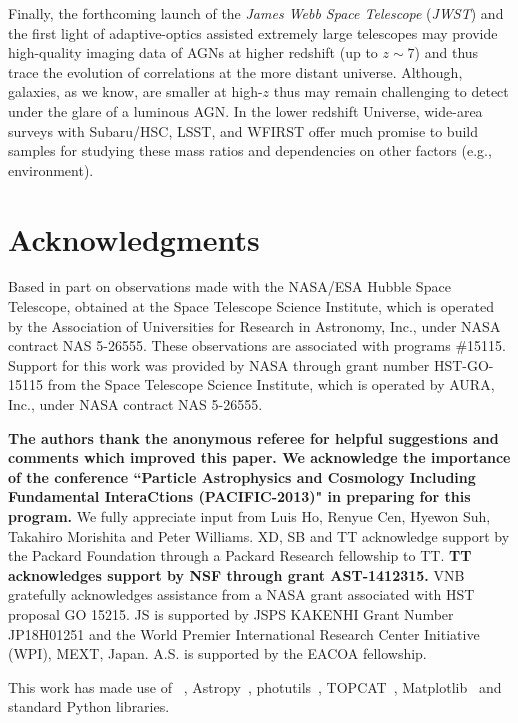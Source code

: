 \documentclass[apj]{emulateapj}
\begin{document}
Finally, the forthcoming launch of the {\it James Webb Space Telescope} ({\it JWST}) and the first light of adaptive-optics assisted extremely large telescopes may provide high-quality imaging data of AGNs at higher redshift (up to $z\sim7$) and thus trace the evolution of correlations at the more distant universe. Although, galaxies, as we know, are smaller at high-$z$ thus may remain challenging to detect under the glare of a luminous AGN. In the lower redshift Universe, wide-area surveys with Subaru/HSC, LSST, and WFIRST offer much promise to build samples for studying these mass ratios and dependencies on other factors (e.g., environment).  

\section*{Acknowledgments}

Based in part on observations made with the NASA/ESA Hubble Space Telescope, obtained at the Space Telescope Science Institute, which is operated by the Association of Universities for Research in Astronomy, Inc., under NASA contract NAS 5-26555. These observations are associated with programs \#15115. Support for this work was provided by NASA through grant number HST-GO-15115 from the Space Telescope Science Institute, which is operated by AURA, Inc., under NASA contract NAS 5-26555.

{\bf The authors thank the anonymous referee for helpful suggestions and comments which improved this paper. We acknowledge the importance of the conference ``Particle Astrophysics and Cosmology Including Fundamental InteraCtions (PACIFIC-2013)" in preparing for this program.} We fully appreciate input from Luis Ho, Renyue Cen, Hyewon Suh, Takahiro Morishita and Peter Williams. XD, SB and TT acknowledge support by the Packard Foundation through a Packard Research fellowship to TT. {\bf TT acknowledges support by NSF through grant AST-1412315.} VNB gratefully acknowledges assistance from a NASA grant associated with HST proposal GO 15215. JS is supported by JSPS KAKENHI Grant Number JP18H01251 and the World Premier International Research Center Initiative (WPI), MEXT, Japan. A.S. is supported by the EACOA fellowship.


This work has made use of \lenstronomy~\citep{lenstronomy}, {\sc Astropy}~\citep{Astropy}, {\sc photutils}~\citep{photutils}, {\sc TOPCAT}~\citep{TOPCAT}, {\sc Matplotlib}~\citep{Matplotlib} %
and standard Python libraries.
\end{document}
